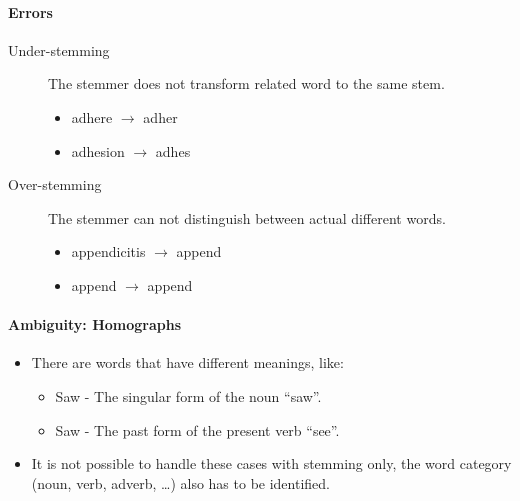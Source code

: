 \documentclass[a4paper, 11pt, accentcolor = tud3b]{tudreport}
\providecommand{\ambiguity}[1]{\textcolor{ambiguityorange}{#1}}
\begin{document}
                    \paragraph{Errors} %
                    	\begin{description}
                    		\item[Under-stemming] The stemmer does not transform related word to the same stem.
                    			\begin{itemize}
                    				\item adhere \(\rightarrow\) adhe\ambiguity{r}
                    				\item adhesion \(\rightarrow\) adhe\ambiguity{s}
                    			\end{itemize}
                    		\item[Over-stemming] The stemmer can not distinguish between actual different words.
                    			\begin{itemize}
                    				\item appendicitis \(\rightarrow\) append
                    				\item append \(\rightarrow\) append
                    			\end{itemize}
                    	\end{description}

                    \paragraph{Ambiguity: Homographs} %
                        \begin{itemize}
                        	\item There are words that have different meanings, like:
                        		\begin{itemize}
                        			\item Saw - The singular form of the noun \enquote{saw}.
                        			\item Saw - The past form of the present verb \enquote{see}.
                        		\end{itemize}
                        	\item It is not possible to handle these cases with stemming only, the word category (noun, verb, adverb, \dots) also has to be identified.
                        \end{itemize}
\end{document}
